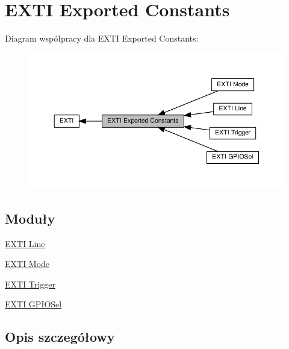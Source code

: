 \hypertarget{group___e_x_t_i___exported___constants}{}\section{E\+X\+TI Exported Constants}
\label{group___e_x_t_i___exported___constants}
Diagram współpracy dla E\+X\+TI Exported Constants\+:\nopagebreak
\begin{figure}[H]
\begin{center}
\leavevmode
\includegraphics[width=350pt]{group___e_x_t_i___exported___constants}
\end{center}
\end{figure}
\subsection*{Moduły}
\begin{DoxyCompactItemize}
\item 
\hyperlink{group___e_x_t_i___line}{E\+X\+T\+I Line}
\item 
\hyperlink{group___e_x_t_i___mode}{E\+X\+T\+I Mode}
\item 
\hyperlink{group___e_x_t_i___trigger}{E\+X\+T\+I Trigger}
\item 
\hyperlink{group___e_x_t_i___g_p_i_o_sel}{E\+X\+T\+I G\+P\+I\+O\+Sel}
\end{DoxyCompactItemize}


\subsection{Opis szczegółowy}
